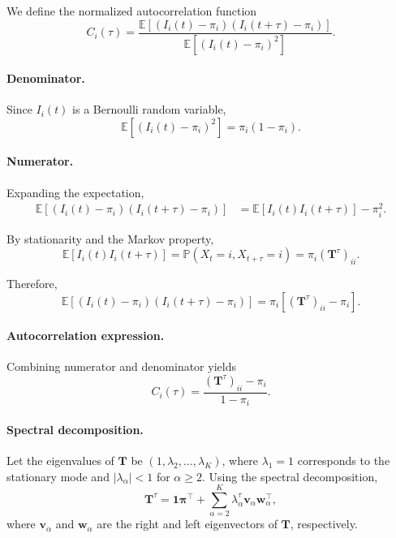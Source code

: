 \documentclass[11pt]{article}
\begin{document}
We define the normalized autocorrelation function
\begin{equation}
    C_i(\tau)
    =
    \frac{
        \mathbb{E}\!\left[(I_i(t)-\pi_i)(I_i(t+\tau)-\pi_i)\right]
    }{
        \mathbb{E}\!\left[(I_i(t)-\pi_i)^2\right]
    }.
\end{equation}

\paragraph{Denominator.}
Since $I_i(t)$ is a Bernoulli random variable,
\begin{equation}
    \mathbb{E}\!\left[(I_i(t)-\pi_i)^2\right]
    = \pi_i(1-\pi_i).
\end{equation}

\paragraph{Numerator.}
Expanding the expectation,
\begin{equation}
\begin{aligned}
    \mathbb{E}\!\left[(I_i(t)-\pi_i)(I_i(t+\tau)-\pi_i)\right]
    &=
    \mathbb{E}[I_i(t)I_i(t+\tau)] - \pi_i^2.
\end{aligned}
\end{equation}

By stationarity and the Markov property,
\begin{equation}
    \mathbb{E}[I_i(t)I_i(t+\tau)]
    =
    \mathbb{P}(X_t=i, X_{t+\tau}=i)
    =
    \pi_i (\mathbf{T}^\tau)_{ii}.
\end{equation}

Therefore,
\begin{equation}
    \mathbb{E}\!\left[(I_i(t)-\pi_i)(I_i(t+\tau)-\pi_i)\right]
    =
    \pi_i \left[(\mathbf{T}^\tau)_{ii} - \pi_i \right].
\end{equation}

\paragraph{Autocorrelation expression.}
Combining numerator and denominator yields
\begin{equation}
    C_i(\tau)
    =
    \frac{(\mathbf{T}^\tau)_{ii} - \pi_i}{1-\pi_i}.
\end{equation}

\paragraph{Spectral decomposition.}
Let the eigenvalues of $\mathbf{T}$ be $(1,\lambda_2,\dots,\lambda_K)$, where
$\lambda_1=1$ corresponds to the stationary mode and
$|\lambda_\alpha|<1$ for $\alpha\ge2$.
Using the spectral decomposition,
\begin{equation}
    \mathbf{T}^\tau
    =
    \mathbf{1}\boldsymbol{\pi}^\top
    + \sum_{\alpha=2}^K \lambda_\alpha^\tau
    \mathbf{v}_\alpha \mathbf{w}_\alpha^\top,
\end{equation}
where $\mathbf{v}_\alpha$ and $\mathbf{w}_\alpha$ are the right and left
eigenvectors of $\mathbf{T}$, respectively.
\end{document}
